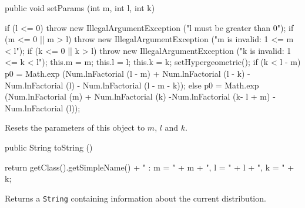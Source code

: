 \begin{code}

   public void setParams (int m, int l, int k)\begin{hide} {
      if (l <= 0)
         throw new IllegalArgumentException ("l must be greater than 0");
      if (m <= 0 || m > l)
         throw new IllegalArgumentException ("m is invalid: 1 <= m < l");
      if (k <= 0 || k > l)
         throw new IllegalArgumentException ("k is invalid: 1 <= k < l");
      this.m = m;
      this.l = l;
      this.k = k;
      setHypergeometric();
      if (k < l - m)
          p0 = Math.exp (Num.lnFactorial (l - m) + Num.lnFactorial (l - k)
                               -Num.lnFactorial (l) - Num.lnFactorial (l - m - k));
      else
          p0 = Math.exp (Num.lnFactorial (m) + Num.lnFactorial (k)
                               -Num.lnFactorial (k- l + m) - Num.lnFactorial (l));
   }\end{hide}
\end{code}
 \begin{tabb}
    Resets the parameters of this object to $m$, $l$ and $k$.
 \end{tabb}
\begin{hide}\begin{code}

   public String toString ()\begin{hide} {
      return getClass().getSimpleName() + " : m = " + m + ", l = " + l + ", k = " + k;
   }\end{hide}
\end{code}
\begin{tabb}
   Returns a \texttt{String} containing information about the current distribution.
\end{tabb}\end{hide}
\begin{code}\begin{hide}
}\end{hide}\end{code}

